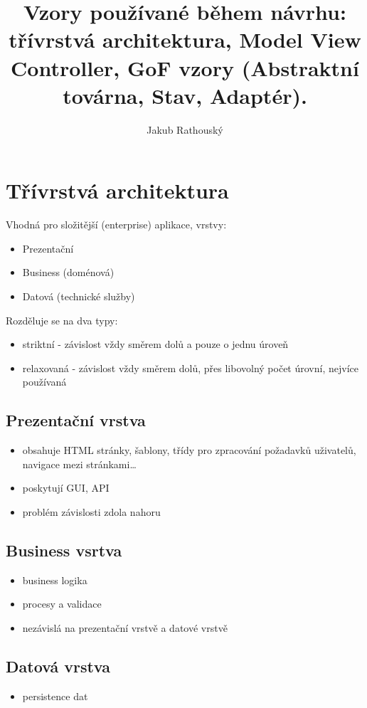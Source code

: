 \documentclass{szzclass}
\title{Vzory používané během návrhu: třívrstvá architektura, Model View Controller, GoF vzory (Abstraktní továrna, Stav, Adaptér).}
\author{Jakub Rathouský}
\begin{document}
\maketitle
\newpage
\tableofcontents
\newpage

\section{Třívrstvá architektura}
Vhodná pro složitější (enterprise) aplikace, vrstvy:
\begin{itemize}
    \item Prezentační
    \item Business (doménová)
    \item Datová (technické služby)
\end{itemize}

Rozděluje se na dva typy:
\begin{itemize}
    \item striktní - závislost vždy směrem dolů a pouze o jednu úroveň
    \item relaxovaná - závislost vždy směrem dolů, přes libovolný počet úrovní, nejvíce používaná
\end{itemize}
\subsection{Prezentační vrstva}
\begin{itemize}
    \item obsahuje HTML stránky, šablony, třídy pro zpracování požadavků uživatelů, navigace mezi stránkami\dots
    \item poskytují GUI, API
    \item problém závislosti zdola nahoru
\end{itemize}
\subsection{Business vsrtva}
\begin{itemize}
    \item business logika
    \item procesy a validace
    \item nezávislá na prezentační vrstvě a datové vrstvě
\end{itemize}
\subsection{Datová vrstva}
\begin{itemize}
    \item persistence dat
\end{itemize}
\end{document}

